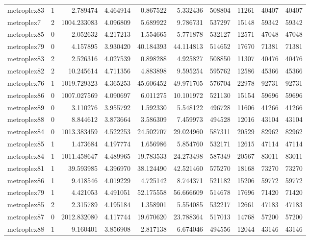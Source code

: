 \begin{longtable}{|l|r|r|r|r|r|r|r|r|r|}
metroplex83 & 1 & 2.789474 & 4.464914 & 0.867522 & 5.332436 & 508804 & 11261 & 40407 & 40407 \\
metroplex7 & 2 & 1004.233083 & 4.096809 & 5.689922 & 9.786731 & 537297 & 15148 & 59342 & 59342 \\
metroplex85 & 0 & 2.052632 & 4.217213 & 1.554665 & 5.771878 & 532127 & 12571 & 47048 & 47048 \\
metroplex79 & 0 & 4.157895 & 3.930420 & 40.184393 & 44.114813 & 514652 & 17670 & 71381 & 71381 \\
metroplex83 & 2 & 2.526316 & 4.027539 & 0.898288 & 4.925827 & 508850 & 11307 & 40476 & 40476 \\
metroplex82 & 2 & 10.245614 & 4.711356 & 4.883898 & 9.595254 & 595762 & 12586 & 45366 & 45366 \\
metroplex76 & 1 & 1019.729323 & 4.365253 & 45.606452 & 49.971705 & 576704 & 22978 & 92731 & 92731 \\
metroplex86 & 0 & 1007.027569 & 4.090697 & 6.011275 & 10.101972 & 521130 & 15154 & 59696 & 59696 \\
metroplex89 & 0 & 3.110276 & 3.955792 & 1.592330 & 5.548122 & 496728 & 11606 & 41266 & 41266 \\
metroplex88 & 0 & 8.844612 & 3.873664 & 3.586309 & 7.459973 & 494528 & 12016 & 43104 & 43104 \\
metroplex84 & 0 & 1013.383459 & 4.522253 & 24.502707 & 29.024960 & 587311 & 20529 & 82962 & 82962 \\
metroplex85 & 1 & 1.473684 & 4.197774 & 1.656986 & 5.854760 & 532171 & 12615 & 47114 & 47114 \\
metroplex84 & 1 & 1011.458647 & 4.489965 & 19.783533 & 24.273498 & 587349 & 20567 & 83011 & 83011 \\
metroplex81 & 1 & 39.593985 & 4.396970 & 38.124490 & 42.521460 & 575270 & 18168 & 73270 & 73270 \\
metroplex86 & 1 & 9.418546 & 4.019229 & 4.725142 & 8.744371 & 521182 & 15206 & 59772 & 59772 \\
metroplex79 & 1 & 4.421053 & 4.491051 & 52.175558 & 56.666609 & 514678 & 17696 & 71420 & 71420 \\
metroplex85 & 2 & 2.315789 & 4.195184 & 1.358901 & 5.554085 & 532217 & 12661 & 47183 & 47183 \\
metroplex87 & 0 & 2012.832080 & 4.117744 & 19.670620 & 23.788364 & 517013 & 14768 & 57200 & 57200 \\
metroplex88 & 1 & 9.160401 & 3.856908 & 2.817138 & 6.674046 & 494556 & 12044 & 43146 & 43146 \\

\end{longtable}
